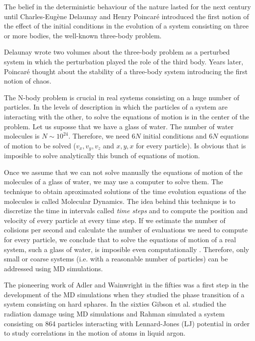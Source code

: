 \documentclass[b5paper,openright,10pt]{book}
\begin{document}
The belief in the deterministic behaviour of the nature lasted for the next century until Charles-Eugène Delaunay and Henry Poincaré introduced the first notion of the effect of the initial conditions in the evolution of a system consisting on three or more bodies, the well-known three-body problem. 

Delaunay wrote two volumes \cite{Delaunay1860} about the three-body problem as a perturbed system in which the perturbation played the role of the third body. 
Years later, Poincaré thought about the stability of a three-body system introducing the first notion of chaos. 

The N-body problem is crucial in real systems consisting on a huge number of particles. In the levels of description in which the particles of a system are interacting with the other, to solve the equations of motion is in the center of the problem. Let us suposse that we have a glass of water. 
The number of water molecules is $N \sim 10^{24}$. Therefore, we need  $6N$ initial conditions and $6N$ equations of motion to be solved ($v_x,v_y,v_z$ and $x,y,x$ for every particle). Is obvious that is imposible to solve analytically this bunch of equations of motion.

Once we assume that we can not solve manually the equations of motion of the molecules of a glass of water, we may use a computer to solve them. 
The technique to obtain aproximated solutions of the time evolution equations of the molecules is called Molecular Dynamics.
The idea behind this technique is to discretize the time in intervals called \textit{time steps} and to compute the position and velocity of every particle at every time step. If we estimate the number of colisions per second and calculate the number of evaluations we need to compute for every particle, we conclude that to solve the equations of motion of a real system, such a glass of water, is imposible even computationally \cite{TesisArturo}.
Therefore, only small or coarse systems (i.e. with a reasonable number of particles) can be addressed using MD simulations. 

The pioneering work of Adler and Wainwright \cite{Alder1957} in the fifties was a first step in the development of the MD simulations when they studied the phase transition of a system consisting on hard sphares. In the sixties Gibson et al. \cite{Gibson1960} studied the radiation damage using MD simulations and  Rahman \cite{Rahman1964} simulated a system consisting on 864 particles interacting with Lennard-Jones (LJ) potential in order to study correlations in the motion of atoms in liquid argon.  
\end{document}
